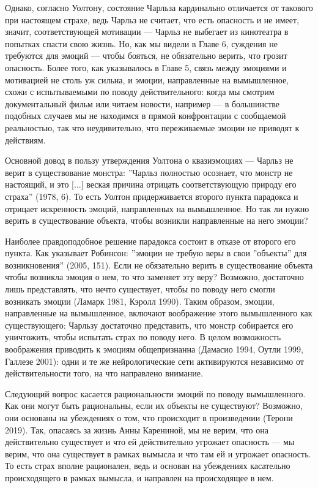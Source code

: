 \documentclass[11pt]{book}
\begin{document}
Однако, согласно Уолтону, состояние Чарльза кардинально отличается от такового при настоящем страхе, ведь Чарльз не считает, что есть опасность и не имеет, значит, соответствующей мотивации --- Чарльз не выбегает из кинотеатра в попытках спасти свою жизнь. Но, как мы видели в Главе 6, суждения не требуются для эмоций --- чтобы бояться, не обязательно верить, что грозит опасность. Более того, как указывалось в Главе 5, связь между эмоциями и мотивацией не столь уж сильна, и эмоции, направленные на вымышленное, схожи с испытываемыми по поводу действительного: когда мы смотрим документальный фильм или читаем новости, например --- в большинстве подобных случаев мы не находимся в прямой конфронтации с сообщаемой реальностью, так что неудивительно, что переживаемые эмоции не приводят к действиям.

Основной довод в пользу утверждения Уолтона о квазиэмоциях --- Чарльз не верит в существование монстра: ''Чарльз полностью осознает, что монстр не настоящий, и это [...] веская причина отрицать соответствующую природу его страха'' (1978, 6). То есть Уолтон придерживается второго пункта парадокса и отрицает искренность эмоций, направленных на вымышленное. Но так ли нужно верить в существование объекта, чтобы возникли направленные на него эмоции?

Наиболее правдоподобное решение парадокса состоит в отказе от второго его пункта. Как указывает Робинсон: ''эмоции не требую веры в свои ''объекты'' для возникновения'' (2005, 151). Если не обязательно верить в существование объекта чтобы возникла эмоция о нем, то что заменяет эту веру? Возможно, достаточно лишь представлять, что нечто существует, чтобы по поводу него смогли возникать эмоции (Ламарк 1981, Кэролл 1990). Таким образом, эмоции, направленные на вымышленное, включают воображение этого вымышленного как существующего: Чарльзу достаточно представить, что монстр собирается его уничтожить, чтобы испытать страх по поводу него. В целом возможность воображения приводить к эмоциям общепризнанна (Дамасио 1994, Оутли 1999, Галлезе 2001): одни и те же нейрологические сети активируются независимо от действительности того, на что направлено внимание.

Следующий вопрос касается рациональности эмоций по поводу вымышленного. Как они могут быть рациональны, если их объекты не существуют? Возможно, они основаны на убеждениях о том, что происходит в произведении (Терони 2019). Так, опасаясь за жизнь Анны Карениной, мы не верим, что она действительно существует и что ей действительно угрожает опасность --- мы верим, что она существует в рамках вымысла и что там ей и угрожает опасность. То есть страх вполне рационален, ведь и основан на убеждениях касательно происходящего в рамках вымысла, и направлен на происходящее в нем.
\end{document}
